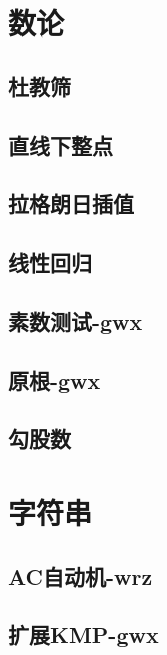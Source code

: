 \documentclass[titlepage,a4paper,10pt]{article}
\begin{document}
\begin{spacing}{0.8}
		\section{数论}
			\subsection{杜教筛}
				
			\subsection{直线下整点}
				
			\subsection{拉格朗日插值}
				
			\subsection{线性回归}
				
			\subsection{素数测试-gwx}
				
			\subsection{原根-gwx}
				
			\subsection{勾股数}
				
		\section{字符串}
			\subsection{AC自动机-wrz}
				
			\subsection{扩展KMP-gwx}
				

\end{spacing}
\end{document}
